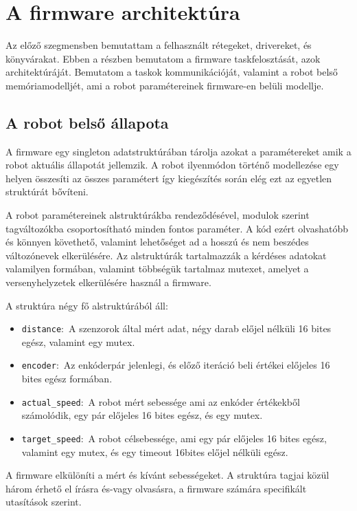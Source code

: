 \section{A firmware architektúra}

Az előző szegmensben bemutattam a felhasznált rétegeket, drivereket, és
könyvárakat. Ebben a részben bemutatom a firmware taskfelosztását, azok
architektúráját. Bemutatom a taskok kommunikációját, valamint a robot belső
memóriamodelljét, ami a robot paramétereinek firmware-en belüli modellje. 

\subsection{A robot belső állapota}

A firmware egy singleton adatstruktúrában tárolja azokat a paramétereket amik a
robot aktuális állapotát jellemzik. A robot ilyenmódon történő modellezése egy
helyen összesíti az összes paramétert így kiegészítés során elég ezt az egyetlen
struktúrát bővíteni.

A robot paramétereinek alstruktúrákba rendeződésével, modulok szerint
tagváltozókba csoportosítható minden fontos paraméter. A kód ezért olvashatóbb és
könnyen követhető, valamint lehetőséget ad a hosszú és nem beszédes változónevek
elkerülésére. Az alstruktúrák tartalmazzák a kérdéses adatokat valamilyen
formában, valamint többségük tartalmaz mutexet, amelyet a versenyhelyzetek
elkerülésére használ a firmware.

A struktúra négy fő alstruktúrából áll:
\begin{itemize}
\item{\verb|distance|:~A szenzorok által mért adat, négy darab előjel nélküli 16
  bites egész, valamint egy mutex.}
\item{\verb|encoder|:~Az enkóderpár jelenlegi, és előző iteráció beli értékei
  előjeles 16 bites egész formában.}
\item{\verb|actual_speed|:~A robot mért sebessége ami az enkóder értékekből
  számolódik, egy pár előjeles 16 bites egész, és egy mutex.}
\item{\verb|target_speed|:~A robot célsebessége, ami egy pár előjeles 16 bites
  egész, valamint egy mutex, és egy timeout 16bites előjel nélküli egész.}
\end{itemize}

A firmware elkülöníti a mért és kívánt sebességeket. A struktúra tagjai
közül három érhető el írásra és-vagy olvasásra, a firmware számára specifikált
utasítások szerint.

